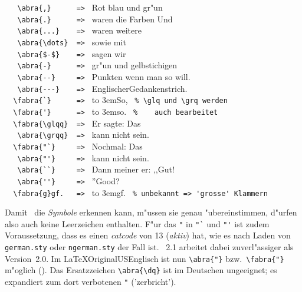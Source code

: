 \documentclass[12pt,a4paper]{article}
\begin{document}
\vspace{1.75ex}\noindent
   \verb|   \abra{,}      => | Rot\abra{,} blau und gr"un \\[-.5ex]
   \verb|   \abra{.}      => | waren die Farben Und \\[-.5ex]
   \verb|   \abra{...}    => |  waren weitere \\[-.5ex]
   \verb|   \abra{\dots}  => | sowie \abra{\dots} mit \\[-.5ex]
   \verb|   \abra{$-$}    => | \abra{$-$} sagen wir \abra{$-$} \\[-.5ex]
   \verb|   \abra{-}      => | gr"un\abra{-} und gelb\abra{-}stichigen \\[-.5ex]
   \verb|   \abra{--}     => | Punkten \abra{--} wenn man so will.\\[-.5ex]
   \verb|   \abra{---}    => | Englischer\abra{---}Gedankenstrich.\\[-.5ex]
   \verb|  \fabra{`}      => | \hbox to 3em{So,\hfill} \verb| % \glq und \grq werden| \\[-.5ex]
   \verb|  \fabra{'}      => | \hbox to 3em{so.\hfill}  \verb| %    auch bearbeitet|\\[-.5ex]
   \verb|  \fabra{\glqq}  => | Er sagte: \fabra{\glqq}Das \\[-.5ex]
   \verb|   \abra{\grqq}  => | kann nicht sein.\abra{\grqq} \\[-.5ex]
   \verb|  \fabra{"`}     => | Nochmal: Das \\[-.5ex]
   \verb|   \abra{"'}     => | kann nicht sein. \\[-.5ex]
   \verb|   \abra{``}     => | Dann meiner er: ,,Gut! \\[-.5ex]
   \verb|   \abra{''}     => | ''Good? \\
   \verb|  \fabra{g}gf.   => | \hbox to 3em{gf.\hfill} \verb| % unbekannt => 'grosse' Klammern|


\vspace{2ex}\noindent
Damit \BibArts\ die \textit{Symbole} erkennen kann, m"ussen sie genau "ubereinstimmen,
d"urfen also auch keine Leerzeichen enthalten. F"ur das \verb|"| in
\verb|"`| und \verb|"'| ist zudem Voraussetzung, dass es einen \textit{catcode} 
von 13 (\textit{aktiv}) hat, wie es nach Laden von \verb|german.sty| oder 
\verb|ngerman.sty| der Fall ist. \BibArts~2.1 arbeitet dabei zuverl"assiger als 
Version~2.0. Im \LaTeX\hy Original\hy US\hy Englisch ist nun 
\verb|\abra{"}| bzw.\ \verb|\fabra{"}| m"oglich ({\originalTeX{}}).
Das Ersatzzeichen \verb|\abra{\dq}| ist im Deutschen ungeeignet; es expandiert 
zum dort verbotenen\hspace{-.1em} \verb|"|\hspace{.1em} ('zerbricht').
\end{document}
